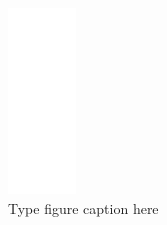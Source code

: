 \documentclass{article}
\begin{document}
\begin{figure}[h!]
 \begin{center}
  \includegraphics[max width=\textwidth]{calculations/881.png}
  \caption{Type figure caption here}
  \label{fig:881}
 \end{center}
\end{figure}
\end{document}
